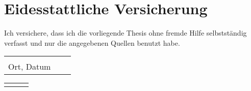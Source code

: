 \chapter*{Eidesstattliche Versicherung}
\thispagestyle{empty}

Ich versichere, dass ich die vorliegende Thesis ohne fremde Hilfe selbstständig verfasst und nur die angegebenen Quellen benutzt habe.

\vspace{4cm}

\vspace{1,5 cm} 
\begin{tabular}{p{6cm}p{.5cm}l}
\hrulefill  \\
\centering Ort, Datum
\end{tabular}%
\hfill
\begin{tabular}{p{7cm}p{.5cm}l}
\hrulefill \\
\end{tabular}%

